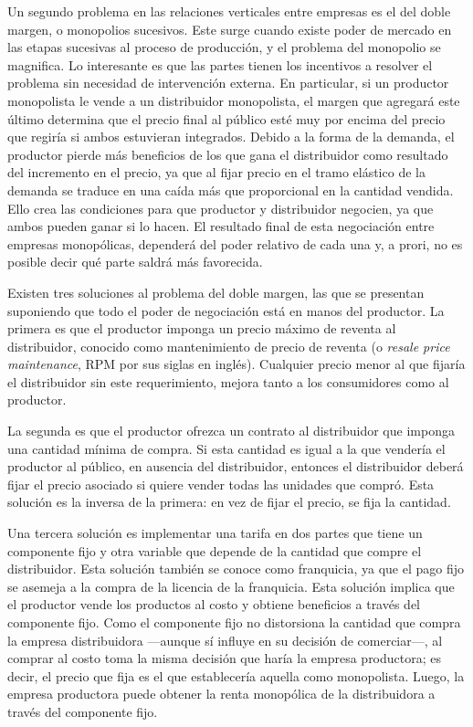 \documentclass[
  12pt,
  spanish,
]{book}
\begin{document}
Un segundo problema en las relaciones verticales entre empresas es el
del doble margen, o monopolios sucesivos. Este surge cuando existe poder
de mercado en las etapas sucesivas al proceso de producción, y el
problema del monopolio se magnifica. Lo interesante es que las partes
tienen los incentivos a resolver el problema sin necesidad de
intervención externa. En particular, si un productor monopolista le
vende a un distribuidor monopolista, el margen que agregará este último
determina que el precio final al público esté muy por encima del precio
que regiría si ambos estuvieran integrados. Debido a la forma de la
demanda, el productor pierde más beneficios de los que gana el
distribuidor como resultado del incremento en el precio, ya que al fijar
precio en el tramo elástico de la demanda se traduce en una caída más
que proporcional en la cantidad vendida. Ello crea las condiciones para
que productor y distribuidor negocien, ya que ambos pueden ganar si lo
hacen. El resultado final de esta negociación entre empresas
monopólicas, dependerá del poder relativo de cada una y, a prori, no es
posible decir qué parte saldrá más favorecida.

Existen tres soluciones al problema del doble margen, las que se
presentan suponiendo que todo el poder de negociación está en manos del
productor. La primera es que el productor imponga un precio máximo de
reventa al distribuidor, conocido como mantenimiento de precio de
reventa (o \emph{resale price maintenance}, RPM por sus siglas en
inglés). Cualquier precio menor al que fijaría el distribuidor sin este
requerimiento, mejora tanto a los consumidores como al productor.

La segunda es que el productor ofrezca un contrato al distribuidor que
imponga una cantidad mínima de compra. Si esta cantidad es igual a la
que vendería el productor al público, en ausencia del distribuidor,
entonces el distribuidor deberá fijar el precio asociado si quiere
vender todas las unidades que compró. Esta solución es la inversa de la
primera: en vez de fijar el precio, se fija la cantidad.

Una tercera solución es implementar una tarifa en dos partes que tiene
un componente fijo y otra variable que depende de la cantidad que compre
el distribuidor. Esta solución también se conoce como franquicia, ya que
el pago fijo se asemeja a la compra de la licencia de la franquicia.
Esta solución implica que el productor vende los productos al costo y
obtiene beneficios a través del componente fijo. Como el componente fijo
no distorsiona la cantidad que compra la empresa distribuidora ---aunque
sí influye en su decisión de comerciar---, al comprar al costo toma la
misma decisión que haría la empresa productora; es decir, el precio que
fija es el que establecería aquella como monopolista. Luego, la empresa
productora puede obtener la renta monopólica de la distribuidora a
través del componente fijo.
\end{document}

